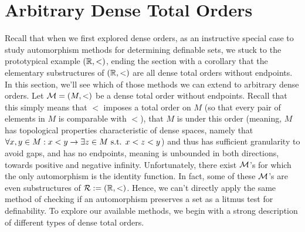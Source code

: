 \documentclass{article}
\begin{document}
\section{Arbitrary Dense Total Orders}
Recall that when we first explored dense orders, as an instructive special case to study automorphism methods for determining definable sets, we stuck to the prototypical example $ (\mathbb{R}, <) $, ending the section with a corollary that the elementary substructures of $ (\mathbb{R}, <) $ are all dense total orders without endpoints. In this section, we'll see which of those methods we can extend to arbitrary dense orders.
\nn
Let $ \mathcal{M} = (M, <) $ be a dense total order without endpoints. Recall that this simply means that $ < $ imposes a total order on $ M $ (so that every pair of elements in $ M $ is comparable with $ < $), that $ M $ is  under this order (meaning, $ M $ has topological properties characteristic of dense spaces, namely that $ \forall x, y \in M: x < y \rightarrow \exists z \in M \textnormal{ s.t. } x < z < y $) and thus has sufficient granularity to avoid gaps, and has no endpoints, meaning is unbounded in both directions, towards positive and negative infinity. Unfortunately, there exist $ \mathcal{M} $'s for which the only automorphism is the identity function. In fact, some of these $ \mathcal{M} $'s are even substructures of $ \mathcal{R} := (\mathbb{R}, <) $. Hence, we can't directly apply the same method of checking if an automorphism preserves a set as a litmus test for definability. To explore our available methods, we begin with a strong description of different types of dense total orders.
\end{document}

